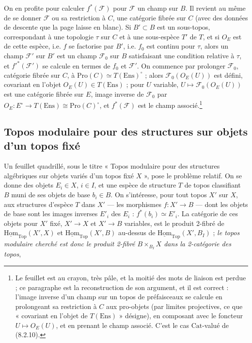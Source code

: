 \documentclass[11pt,a4paper]{article}
\begin{document}
On en profite pour calculer $f^{*}(\mathcal{F})$ pour $\mathcal{F}$ un champ
sur $B$. Il revient au même de se donner $\mathcal{F}$ ou sa restriction
à $C$, une catégorie fibrée sur $C$ (avec des données de descente que la
page laisse en blanc). Si $B' \subset B$ est un sous-topos, correspondant
à une topologie $\tau$ sur $C$ et à une sous-espèce $T'$ de $T$, et si
$O_{E}$ est de cette espèce, i.e. $f$ se factorise par $B'$, i.e. $f_{0}$
est continu pour $\tau$, alors un champ $\mathcal{F}'$ sur $B'$ est un
champ $\mathcal{F}_{0}$ sur $B$ satisfaisant une condition relative à
$\tau$, et $f'^{*}(\mathcal{F}')$ se calcule en termes de $f_{0}$ et
$\mathcal{F}'$. On commence par prolonger $\mathcal{F}_{0}$, catégorie fibrée
sur $C$, à $\mathrm{Pro}(C) \simeq T(\mathrm{Ens})^{\circ}$ ; alors
$\mathcal{F}_{0}(O_{E}(U))$ est défini, covariant en l'objet $O_{E}(U) \in
T(\mathrm{Ens})$ ; pour $U$ variable, $U \mapsto \mathcal{F}_{0}(O_{E}(U))$ est
une catégorie fibrée sur $E$, image inverse de $\mathcal{F}_{0}$ par $O_{E} :
E^{\circ} \to T(\mathrm{Ens}) \cong \mathrm{Pro}(C)^{\circ}$, et $f^{*}
(\mathcal{F})$ est le champ associé.\footnote{Le feuillet est au crayon,
très pâle, et la moitié des mots de liaison est perdue ; ce paragraphe est
la reconstruction de son argument, et il est correct : l'image inverse
d'un champ sur un topos de préfaisceaux se calcule en prolongeant sa
restriction à $C$ aux pro-objets (par limites projectives, ce que
« covariant en l'objet de $T(\mathrm{Ens})$ » désigne), en composant avec
le foncteur $U \mapsto O_{E}(U)$, et en prenant le champ associé. C'est le
cas $\mathrm{Cat}$-valué de (8.2.10).}

\subsection*{Topos modulaire pour des structures sur objets d'un topos fixé}

Un feuillet quadrillé, sous le titre « Topos modulaire pour des structures
algébriques sur objets variés d'un topos fixé $X$ », pose le problème
relatif. On se donne des objets $E_{i} \in X$, $i \in I$, et une espèce de
structure $T$ de topos classifiant $B$ muni de ses objets de base $b_{i}
\in B$. On s'intéresse, pour tout topos $X'$ sur $X$, aux structures
d'espèce $T$ dans $X'$ — les morphismes $f : X' \to B$ — dont les objets de
base sont les images inverses $E'_{i}$ des $E_{i}$ : $f^{*}(b_{i}) \simeq
E'_{i}$. La catégorie de ces objets pour $X'$ fixé, $X' \to X$ et $X' \to B$
variables, est le produit 2-fibré de $\underline{\mathrm{Hom}}_{\mathrm{Top}}(X',
X)$ et $\underline{\mathrm{Hom}}_{\mathrm{Top}}(X', B)$ au-dessus de $\underline{
\mathrm{Hom}}_{\mathrm{Top}}(X', B_{I})$ ; \emph{le topos modulaire cherché est
donc le produit 2-fibré $B \times_{B_{I}} X$ dans la 2-catégorie des
topos},
\end{document}
